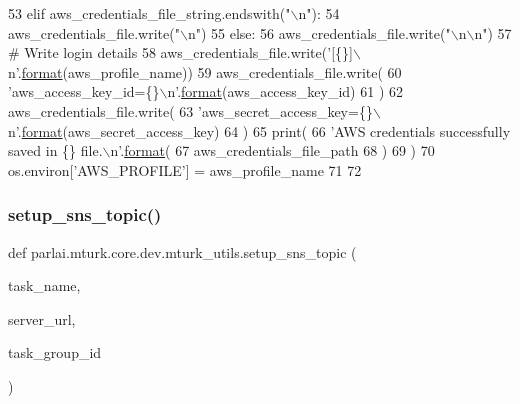 \begin{DoxyCode}
53                 \textcolor{keywordflow}{elif} aws\_credentials\_file\_string.endswith(\textcolor{stringliteral}{"\(\backslash\)n"}):
54                     aws\_credentials\_file.write(\textcolor{stringliteral}{"\(\backslash\)n"})
55                 \textcolor{keywordflow}{else}:
56                     aws\_credentials\_file.write(\textcolor{stringliteral}{"\(\backslash\)n\(\backslash\)n"})
57             \textcolor{comment}{# Write login details}
58             aws\_credentials\_file.write(\textcolor{stringliteral}{'[\{\}]\(\backslash\)n'}.\hyperlink{namespaceparlai_1_1chat__service_1_1services_1_1messenger_1_1shared__utils_a32e2e2022b824fbaf80c747160b52a76}{format}(aws\_profile\_name))
59             aws\_credentials\_file.write(
60                 \textcolor{stringliteral}{'aws\_access\_key\_id=\{\}\(\backslash\)n'}.\hyperlink{namespaceparlai_1_1chat__service_1_1services_1_1messenger_1_1shared__utils_a32e2e2022b824fbaf80c747160b52a76}{format}(aws\_access\_key\_id)
61             )
62             aws\_credentials\_file.write(
63                 \textcolor{stringliteral}{'aws\_secret\_access\_key=\{\}\(\backslash\)n'}.\hyperlink{namespaceparlai_1_1chat__service_1_1services_1_1messenger_1_1shared__utils_a32e2e2022b824fbaf80c747160b52a76}{format}(aws\_secret\_access\_key)
64             )
65         print(
66             \textcolor{stringliteral}{'AWS credentials successfully saved in \{\} file.\(\backslash\)n'}.\hyperlink{namespaceparlai_1_1chat__service_1_1services_1_1messenger_1_1shared__utils_a32e2e2022b824fbaf80c747160b52a76}{format}(
67                 aws\_credentials\_file\_path
68             )
69         )
70     os.environ[\textcolor{stringliteral}{'AWS\_PROFILE'}] = aws\_profile\_name
71 
72 
\end{DoxyCode}
\mbox{\label{namespaceparlai_1_1mturk_1_1core_1_1dev_1_1mturk__utils_a01315ef04ead23e4c1a84c027dcccf3f}} 
\subsubsection{\texorpdfstring{setup\+\_\+sns\+\_\+topic()}{setup\_sns\_topic()}}
{\footnotesize\ttfamily def parlai.\+mturk.\+core.\+dev.\+mturk\+\_\+utils.\+setup\+\_\+sns\+\_\+topic (\begin{DoxyParamCaption}\item[{}]{task\+\_\+name,  }\item[{}]{server\+\_\+url,  }\item[{}]{task\+\_\+group\+\_\+id }\end{DoxyParamCaption})}



